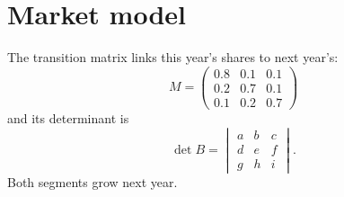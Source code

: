 \documentclass{article}
\begin{document}
\section*{Market model}
The transition matrix links this year's shares to next year's:
\[ M = \begin{pmatrix} 0.8 & 0.1 & 0.1 \\ 0.2 & 0.7 & 0.1 \\ 0.1 & 0.2 & 0.7 \end{pmatrix} \]
and its determinant is
\[ \det B = \begin{vmatrix} a & b & c \\ d & e & f \\ g & h & i \end{vmatrix} . \]
Both segments grow next year.
\end{document}
